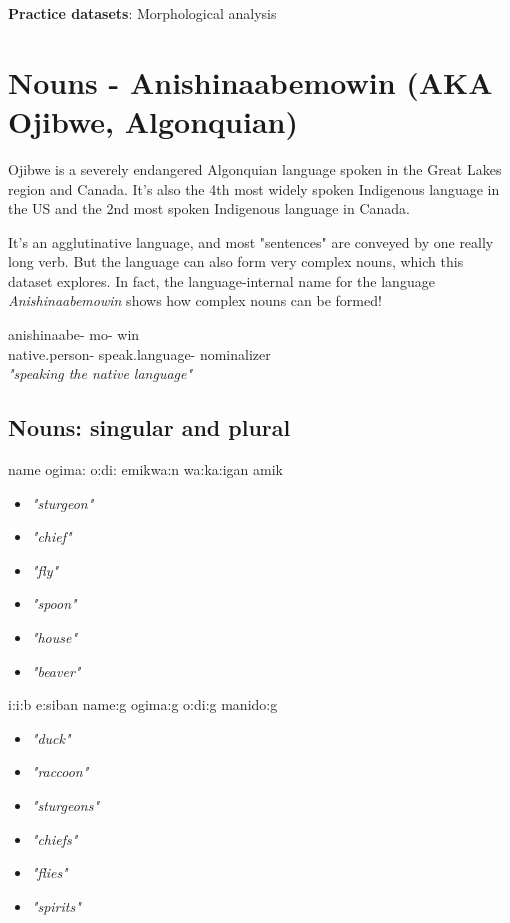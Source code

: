 \documentclass[a4paper,11pt]{article}
\begin{document}
\begin{center}
\Large{\textbf{Practice datasets}: Morphological analysis}
\end{center}


\section{Nouns - Anishinaabemowin (AKA Ojibwe, Algonquian)}

Ojibwe is a severely endangered Algonquian language spoken in the Great Lakes region and Canada. It's also the 4th most widely spoken Indigenous language in the US and the 2nd most spoken Indigenous language in Canada. 

It's an agglutinative language, and most "sentences" are conveyed by one really long verb. But the language can also form very complex nouns, which this dataset explores. In fact, the language-internal name for the language \textit{Anishinaabemowin} shows how complex nouns can be formed!

\begin{exe}
\ex \gll anishinaabe- mo- win \\
	native.person- speak.language- nominalizer \\
\glt \textit{"speaking the native language"}
\end{exe}




\subsection{Nouns: singular and plural}


\begin{multicols}{4}
\begin{exe}
\ex name 
\ex ogima: 
\ex o:d{\textyogh}i: 
\ex emikwa:n
\ex wa:ka:{\textglotstop}igan 
\ex amik
\end{exe}
\columnbreak
\begin{itemize}
\item[] \textit{"sturgeon"}
\item[] \textit{"chief"}
\item[] \textit{"fly"}
\item[] \textit{"spoon"}
\item[] \textit{"house"}
\item[] \textit{"beaver"}
\end{itemize}
\columnbreak
\begin{exe}
\ex {\textyogh}i:i:b
\ex e:siban 
\ex name:g
\ex ogima:g 
\ex o:d{\textyogh}i:g 
\ex manido:g 
\end{exe}
\columnbreak
\begin{itemize}
\item[] \textit{"duck"}
\item[] \textit{"raccoon"}
\item[] \textit{"sturgeons"}
\item[] \textit{"chiefs"}
\item[] \textit{"flies"}
\item[] \textit{"spirits"}
\end{itemize}
\end{multicols}
\end{document}
